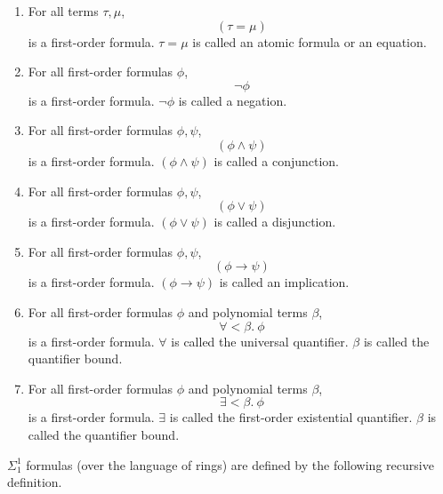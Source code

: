 \documentclass[11pt]{article}
\begin{document}
\begin{enumerate}
	\item For all terms $\tau, \mu$,
		\begin{equation}
			(\tau = \mu)
		\end{equation}
		is a first-order formula. $\tau = \mu$ is called an atomic formula or an equation.
	\item For all first-order formulas $\phi$,
		\begin{equation}
			\neg\phi
		\end{equation}
		is a first-order formula. $\neg\phi$ is called a negation.
	\item For all first-order formulas $\phi, \psi$, 
		\begin{equation}
			(\phi \wedge \psi)
		\end{equation}
		is a first-order formula. $(\phi \wedge \psi)$ is called a conjunction.
	\item For all first-order formulas $\phi, \psi$,
		\begin{equation}
			(\phi \vee \psi)
		\end{equation}
		is a first-order formula. $(\phi \vee \psi)$ is called a disjunction.
	\item For all first-order formulas $\phi, \psi$,
		\begin{equation}
			(\phi \to \psi)
		\end{equation}
		is a first-order formula. $(\phi \to \psi)$ is called an implication.
	\item For all first-order formulas $\phi$ and polynomial terms $\beta$,
		\begin{equation}
			\forall < \beta.\ \phi
		\end{equation}
		is a first-order formula. $\forall$ is called the universal quantifier. $\beta$ is called the quantifier bound.
	\item For all first-order formulas $\phi$ and polynomial terms $\beta$,
		\begin{equation}
			\exists < \beta.\ \phi
		\end{equation}
		is a first-order formula. $\exists$ is called the first-order existential quantifier. $\beta$ is called the quantifier bound.
\end{enumerate}

$\Sigma^1_1$ formulas (over the language of rings) are defined by the following recursive definition.
\end{document}
